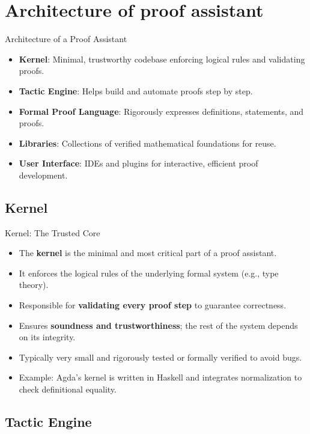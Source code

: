 \documentclass[aspectratio=169, 12pt]{beamer}
\begin{document}
\section{Architecture of proof assistant}
\begin{frame}{Architecture of a Proof Assistant}
\begin{itemize}
    \item \textbf{Kernel}: Minimal, trustworthy codebase enforcing logical rules and validating proofs.
    \item \textbf{Tactic Engine}: Helps build and automate proofs step by step.
    \item \textbf{Formal Proof Language}: Rigorously expresses definitions, statements, and proofs.
    \item \textbf{Libraries}: Collections of verified mathematical foundations for reuse.
    \item \textbf{User Interface}: IDEs and plugins for interactive, efficient proof development.
\end{itemize}
\end{frame}
\subsection*{Kernel}
\begin{frame}{Kernel: The Trusted Core}
\begin{itemize}
    \item The \textbf{kernel} is the minimal and most critical part of a proof assistant.
    \item It enforces the logical rules of the underlying formal system (e.g., type theory).
    \item Responsible for \textbf{validating every proof step} to guarantee correctness.
    \item Ensures \textbf{soundness and trustworthiness}; the rest of the system depends on its integrity.
    \item Typically very small and rigorously tested or formally verified to avoid bugs.
    \item Example: Agda’s kernel is written in Haskell and integrates normalization to check definitional equality.
\end{itemize}
\end{frame}
\subsection*{Tactic Engine}
\end{document}
